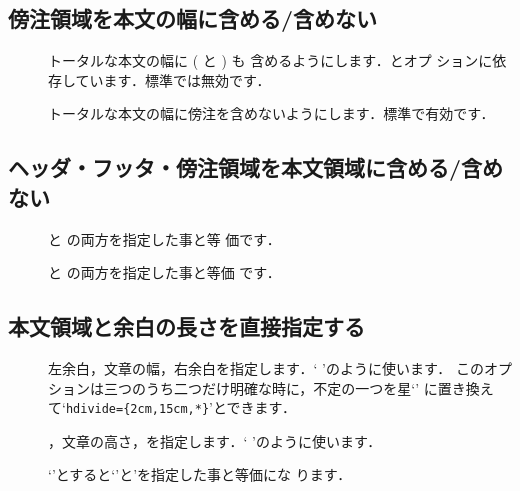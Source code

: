 \subsection{傍注領域を本文の幅に含める/含めない}

\begin{description}
 \item[]
  トータルな本文の幅に ( と ) も
  含めるようにします．とオプ
  ションに依存しています．標準では無効です．
 \item[]
  トータルな本文の幅に傍注を含めないようにします．標準で有効です．
\end{description}

\subsection{ヘッダ・フッタ・傍注領域を本文領域に含める/含めない}

\begin{description}
  \item[]
   と  の両方を指定した事と等
  価です．
 \item[]
   と  の両方を指定した事と等価
  です．
\end{description}


\subsection{本文領域と余白の長さを直接指定する}

\begin{description}
 \item[]
  左余白，文章の幅，右余白を指定します．`%
  'のように使います．
  このオプションは三つのうち二つだけ明確な時に，不定の一つを星`\str{*}'
  に置き換えて`\verb|hdivide={2cm,15cm,*}|'とできます．
 \item[]
  ，文章の高さ，を指定します．`%
  'のように使います．
 \item[]
  `'とすると`'と'を指定した事と等価にな
  ります．
\end{description}


